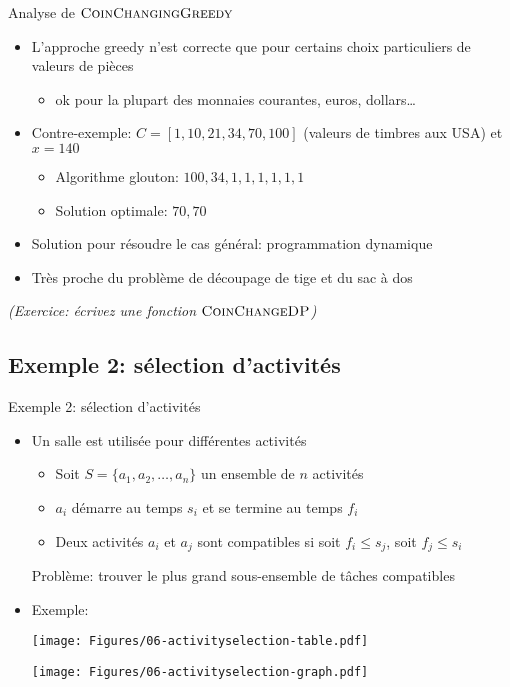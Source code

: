\begin{frame}{Analyse de $\textnormal{\scshape CoinChangingGreedy}$}
\begin{itemize}
\item L'approche greedy n'est correcte que pour certains choix particuliers de valeurs de pièces
\begin{itemize}
\item ok pour la plupart des monnaies courantes, euros, dollars\ldots
\end{itemize}
\item Contre-exemple: $C=[1,10,21,34,70,100]$ (valeurs de timbres aux USA) et $x=140$
\begin{itemize}
\item Algorithme glouton: $100,34,1,1,1,1,1,1$
\item Solution optimale: $70,70$
\end{itemize}
\bigskip
\item Solution pour résoudre le cas général: programmation dynamique
\item Très proche du problème de découpage de tige et du sac à dos
\end{itemize}

\bigskip

{\it (Exercice: écrivez une fonction $\textnormal{\scshape CoinChangeDP}$)}

\end{frame}

\subsection{Exemple 2: sélection d'activités}

\begin{frame}{Exemple 2: sélection d'activités}
\begin{itemize}
\item Un salle est utilisée pour différentes activités
\begin{itemize}
\item Soit $S=\{a_1, a_2,\ldots,a_n\}$ un ensemble de $n$ activités
\item $a_i$ démarre au temps $s_i$ et se termine au temps $f_i$
\item Deux activités $a_i$ et $a_j$ sont \alert{compatibles} si soit $f_i\leq s_j$, soit $f_j\leq s_i$
\end{itemize}
Problème: trouver le plus grand sous-ensemble de tâches compatibles
\item Exemple:
\centerline{\texttt{[image: Figures/06-activityselection-table.pdf]}}

\centerline{\texttt{[image: Figures/06-activityselection-graph.pdf]}}

\end{itemize}
\end{frame}

